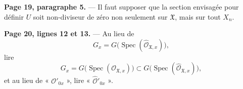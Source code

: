 \noindent\textbf{Page 19, paragraphe 5.} --- Il faut supposer que la section
envisagée pour définir $U$ soit non-diviseur de zéro non seulement sur
$\mathfrak X$, mais sur tout $X_n$.

\noindent\textbf{Page 20, lignes 12 et 13.} --- Au lieu de
\[
  G_x=G\bigl(\operatorname{Spec}(\widehat{\mathcal O}_{\mathfrak X,x})\bigr),
\]
lire
\[
  G_x=G\bigl(\operatorname{Spec}(\mathcal O_{\mathfrak X,x})\bigr)
  \subset
  G\bigl(\operatorname{Spec}(\widehat{\mathcal O}_{\mathfrak X,x})\bigr),
\]
et au lieu de « $\mathcal O'_{0x}$ », lire
« $\widehat{\mathcal O}'_{0x}$ ».
